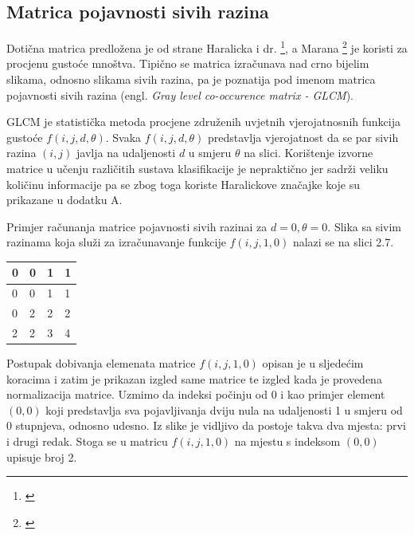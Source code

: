 \documentclass[times, utf8, zavrsni]{fer}
\begin{document}
\newpage

\subsection{Matrica pojavnosti sivih razina}

Dotična matrica predložena je od strane Haralicka i dr. \footnote{\cite{haralick}}, 
a Marana \footnote{\cite{marana}} je koristi za procjenu gustoće mnoštva.
Tipično se matrica izračunava nad crno bijelim slikama, odnosno slikama sivih razina,  pa je poznatija
pod imenom matrica pojavnosti sivih razina (engl. \textit{Gray level co-occurence matrix - GLCM}).

\bigbreak

GLCM je statistička metoda procjene združenih uvjetnih vjerojatnosnih funkcija
gustoće \(f(i,j,d,\theta)\). Svaka \(f(i,j,d,\theta)\) predstavlja vjerojatnost 
da se par sivih razina \((i,j)\) javlja na udaljenosti \(d\) u smjeru \(\theta\)
na slici. Korištenje izvorne matrice u učenju različitih sustava klasifikacije 
je nepraktično jer sadrži veliku količinu informacije pa se zbog toga koriste
Haralickove značajke koje su prikazane u dodatku A.

\bigbreak

Primjer računanja matrice pojavnosti sivih razinai za \(d=0, \theta=0\). Slika 
sa sivim razinama koja služi za izračunavanje funkcije \(f(i,j,1,0)\) nalazi 
se na slici 2.7.

\bigbreak
\bigbreak

\begin{minipage}{\linewidth}
\centering
\begin{tabularx}{0.3\textwidth}{| X | X | X | X |}
\hline
0 & 0 & 1 & 1 \\ 
\hline
0 & 0 & 1 & 1 \\ 
\hline
0 & 2 & 2 & 2 \\
\hline
2 & 2 & 3 & 4 \\
\hline
\end{tabularx}
\end{minipage}

\bigbreak

Postupak dobivanja elemenata matrice \(f(i,j,1,0)\) opisan je u sljedećim koracima i zatim
je prikazan izgled same matrice te izgled kada je provedena normalizacija matrice. 
Uzmimo da indeksi počinju od 0 i kao primjer
element \((0,0)\) koji predstavlja sva pojavljivanja dviju nula na udaljenosti 1
u smjeru od 0 stupnjeva, odnosno udesno. Iz slike je vidljivo da postoje takva
dva mjesta: prvi i drugi redak. Stoga se u matricu \(f(i,j,1,0)\) na mjestu
s indeksom \((0,0)\) upisuje broj 2. 
\end{document}
